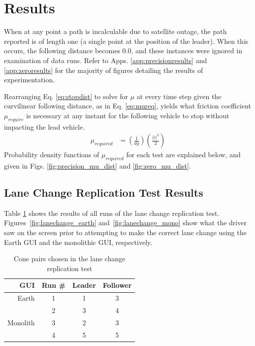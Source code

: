 \section{Results} \label{sec:results}

When at any point a path is incalculable due to satellite outage, the path reported is of length one (a single point at the position of the leader). When this occurs, the following distance becomes 0.0, and these instances were ignored in examination of data runs. Refer to Apps. \ref{app:precisionresults} and \ref{app:zeroresults} for the majority of figures detailing the results of experimentation.

Rearranging Eq. \ref{eq:stopdist} to solve for $\mu$ at every time step given the curvilinear following distance, as in Eq. \ref{eq:mureq}, yields what friction coefficient $\mu_{require}$ is necessary at any instant for the following vehicle to stop without impacting the lead vehicle.
\begin{align} \label{eq:mureq}
    \mu_{required} &= \left( \frac {1} {d g} \right) \left(\frac {|\bar{v}|^2} {2} \right)
\end{align}
Probability density functions of $\mu_{required}$ for each test are explained below, and given in Figs. \ref{fig:precision_mu_dist} and \ref{fig:zero_mu_dist}.


\subsection{Lane Change Replication Test Results} \label{sec:lanechangetestresults}

Table \ref{tab:lanechangeresults} shows the results of all runs of the lane change replication test. Figures~\ref{fig:lanechange_earth} and~\ref{fig:lanechange_mono} show what the driver saw on the screen prior to attempting to make the correct lane change using the Earth GUI and the monolithic GUI, respectively.

\begin{table}[htbp] \centering \caption{Cone pairs chosen in the lane change replication test}
\begin{tabular}{rc|cc} 
    GUI&    Run \#  &     Leader&    Follower \\ \hline\hline
    Earth&      1       &       1   &    3 \\
         &      2       &       3   &    4   \\ \hline
    Monolith&   3       &       2   &    3   \\
         &      4       &       5   &    5 \\ \hline   
\end{tabular} \label{tab:lanechangeresults} \end{table}

